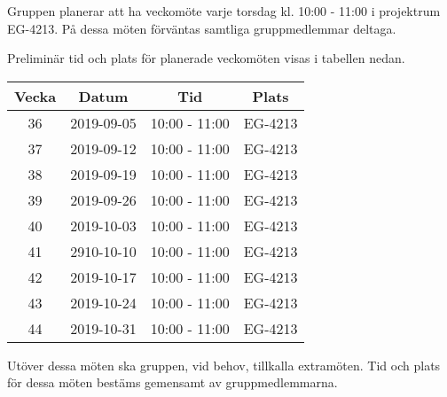 \documentclass[a4paper]{article}
\begin{document}
Gruppen planerar att ha veckomöte varje torsdag kl. 10:00 - 11:00 i projektrum EG-4213. På dessa möten förväntas samtliga gruppmedlemmar deltaga.

Preliminär tid och plats för planerade veckomöten visas i tabellen nedan.

\begin{center}
 \begin{tabular}{||c c c c||} 
 \hline
 Vecka & Datum & Tid & Plats  \\ 
 \hline\hline
 36 & 2019-09-05 & 10:00 - 11:00 & EG-4213 \\ 
 \hline
 37 & 2019-09-12 & 10:00 - 11:00 & EG-4213 \\
 \hline
 38 & 2019-09-19 & 10:00 - 11:00 & EG-4213 \\
 \hline
 39 & 2019-09-26 & 10:00 - 11:00 & EG-4213 \\
 \hline
 40 & 2019-10-03 & 10:00 - 11:00 & EG-4213 \\
 \hline
 41 & 2910-10-10 & 10:00 - 11:00 & EG-4213 \\
 \hline
 42 & 2019-10-17 & 10:00 - 11:00 & EG-4213 \\
 \hline
 43 & 2019-10-24 & 10:00 - 11:00 & EG-4213 \\
 \hline
 44 & 2019-10-31 & 10:00 - 11:00 & EG-4213 \\
 \hline
 \end{tabular}
\end{center}

Utöver dessa möten ska gruppen, vid behov, tillkalla extramöten. Tid och plats för dessa möten bestäms gemensamt av gruppmedlemmarna.
\end{document}
